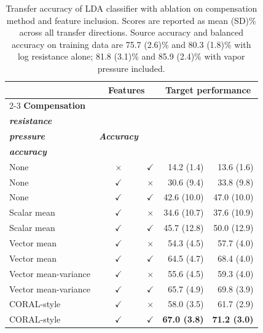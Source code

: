 \documentclass[conference]{IEEEtran}
\begin{document}
\begin{table}[h]
\centering
\footnotesize
\setlength{\tabcolsep}{3pt}
\caption{Transfer accuracy of LDA classifier with ablation on compensation method and feature inclusion. Scores are reported as mean (SD)\% across all transfer directions. Source accuracy and balanced accuracy on training data are 75.7 (2.6)\% and 80.3 (1.8)\% with log resistance alone; 81.8 (3.1)\% and 85.9 (2.4)\% with vapor pressure included.}
\label{tab:features}
\begin{tabular}{|l|c|c|r|r|}
\hline
 & \multicolumn{2}{|c|}{\textbf{Features}} & \multicolumn{2}{|c|}{\textbf{Target performance}} \\ \cline{2-3}\cline{4-5}
\textbf{Compensation} & \shortstack{\textbf{\textit{Log}}\\\textbf{\textit{resistance}}} & \shortstack{\textbf{\textit{Log vapor}}\\\textbf{\textit{pressure}}} & \textbf{\textit{Accuracy}} & \shortstack{\textbf{\textit{Balanced}}\\\textbf{\textit{accuracy}}} \\
\hline
None & $\times$ & $\checkmark$ & 14.2 (1.4) & 13.6 (1.6) \\
None & $\checkmark$ & $\times$ & 30.6 (9.4) & 33.8 (9.8) \\
None & $\checkmark$ & $\checkmark$ & 42.6 (10.0) & 47.0 (10.0) \\
\hline
Scalar mean & $\checkmark$ & $\times$ & 34.6 (10.7) & 37.6 (10.9) \\
Scalar mean & $\checkmark$ & $\checkmark$ & 45.7 (12.8) & 50.0 (12.9) \\
\hline
Vector mean & $\checkmark$ & $\times$ & 54.3 (4.5) & 57.7 (4.0) \\
Vector mean & $\checkmark$ & $\checkmark$ & 64.5 (4.7) & 68.4 (4.0) \\
\hline
Vector mean-variance & $\checkmark$ & $\times$ & 55.6 (4.5) & 59.3 (4.0) \\
Vector mean-variance & $\checkmark$ & $\checkmark$ & 65.7 (4.9) & 69.8 (3.9) \\
\hline
CORAL-style & $\checkmark$ & $\times$ & 58.0 (3.5) & 61.7 (2.9) \\
CORAL-style & $\checkmark$ & $\checkmark$ & \textbf{67.0 (3.8)} & \textbf{71.2 (3.0)} \\
\hline
\end{tabular}
\end{table}
\end{document}
